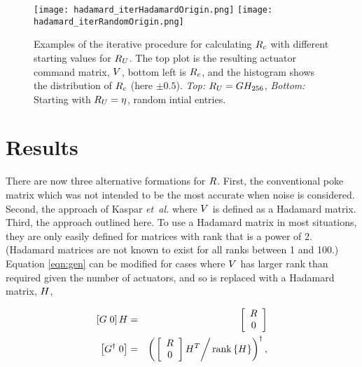 \documentclass[a4paper]{article}
\begin{document}
\begin{figure} \begin{center}
   \texttt{[image: hadamard\_iterHadamardOrigin.png]} 
   \texttt{[image: hadamard\_iterRandomOrigin.png]} 
   \caption{ Examples of the iterative procedure for calculating
    $\mathnormal{R}_c$ with different starting values for $\mathnormal{R}_U$.
    The top plot is the resulting actuator command matrix, $\mathnormal{V}$,
    bottom left is $\mathnormal{R}_c$, and the histogram shows the distribution
    of $\mathnormal{R}_c$ (here $\pm0.5$).
   {\it Top:} $\mathnormal{R}_U=\mathnormal{G}\mathnormal{H}_{256}$,
   {\it Bottom:}  Starting with $\mathnormal{R}_U=\eta$, random intial entries.
  \label{fig:iter} }
\end{center} \end{figure} 

\section{Results}

There are now three alternative formations for $\mathnormal{R}$. First, the
conventional poke matrix which was not intended to be the most accurate
when noise is considered. Second, the approach of Kaspar {\it et~al.} 
where $\mathnormal{V}$ is defined as a Hadamard matrix. Third, the approach
outlined here. To use a Hadamard matrix in most situations, they are only
easily defined for matrices with rank that is a power of 2. (Hadamard
matrices are not known to exist for all ranks between 1 and 100.) Equation
\ref{eqn:gen} can be modified for cases where $\mathnormal{V}$ has larger rank
than required given the number of actuators, and so is replaced with a
Hadamard matrix, $\mathnormal{H}$, 

\begin{eqnarray}
   \left[ G\;0 \right ]\mathnormal{H}&=&\left[\begin{array}{c}
      \mathnormal{R} \\
      0 \end{array} \right] \nonumber \\
   \left[ \mathnormal{G}^{\dagger}\;0 \right ]&=&\left(
      \left.\left[\begin{array}{c}
      \mathnormal{R} \\
      0 \end{array} \right]\mathnormal{H}^{T}\right/
         \mathrm{rank}\left\{\mathnormal{H}\right\}
      \right)^{\dagger},
\end{eqnarray}
\end{document}

